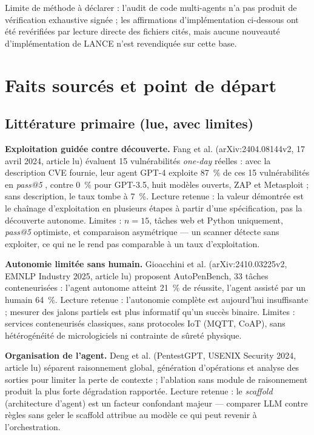 \documentclass[11pt,a4paper]{article}
\begin{document}
Limite de m\'ethode \`a d\'eclarer : l'audit de code multi-agents n'a pas produit de v\'erification exhaustive sign\'ee ; les affirmations d'impl\'ementation ci-dessous ont \'et\'e rev\'erifi\'ees par lecture directe des fichiers cit\'es, mais aucune nouveaut\'e d'impl\'ementation de LANCE n'est revendiqu\'ee sur cette base.

\section{Faits sourc\'es et point de d\'epart}
\label{sec:faits}

\subsection{Litt\'erature primaire (lue, avec limites)}

\textbf{Exploitation guid\'ee contre d\'ecouverte.} Fang et al. (arXiv:2404.08144v2, 17 avril 2024, article lu) \'evaluent 15 vuln\'erabilit\'es \emph{one-day} r\'eelles : avec la description CVE fournie, leur agent GPT-4 exploite 87~\% de ces 15 vuln\'erabilit\'es en \emph{pass@5} \cite{fang2024}, contre 0~\% pour GPT-3.5, huit mod\`eles ouverts, ZAP et Metasploit ; sans description, le taux tombe \`a 7~\%. Lecture retenue : la valeur d\'emontr\'ee est le cha\^inage d'exploitation en plusieurs \'etapes \`a partir d'une sp\'ecification, pas la d\'ecouverte autonome. Limites : $n=15$, t\^aches web et Python uniquement, \emph{pass@5} optimiste, et comparaison asym\'etrique --- un scanner d\'etecte sans exploiter, ce qui ne le rend pas comparable \`a un taux d'exploitation.

\textbf{Autonomie limit\'ee sans humain.} Gioacchini et al. \cite{autopenbench} (arXiv:2410.03225v2, EMNLP Industry 2025, article lu) proposent AutoPenBench, 33 t\^aches conteneuris\'ees : l'agent autonome atteint 21~\% de r\'eussite, l'agent assist\'e par un humain 64~\%. Lecture retenue : l'autonomie compl\`ete est aujourd'hui insuffisante ; mesurer des jalons partiels est plus informatif qu'un succ\`es binaire. Limites : services conteneuris\'es classiques, sans protocoles IoT (MQTT, CoAP), sans h\'et\'erog\'en\'eit\'e de micrologiciels ni contrainte de s\^uret\'e physique.

\textbf{Organisation de l'agent.} Deng et al. \cite{pentestgpt} (PentestGPT, USENIX Security 2024, article lu) s\'eparent raisonnement global, g\'en\'eration d'op\'erations et analyse des sorties pour limiter la perte de contexte ; l'ablation sans module de raisonnement produit la plus forte d\'egradation rapport\'ee. Lecture retenue : le \emph{scaffold} (architecture d'agent) est un facteur confondant majeur --- comparer \og LLM contre r\`egles \fg{} sans geler le scaffold attribue au mod\`ele ce qui peut revenir \`a l'orchestration.
\end{document}
